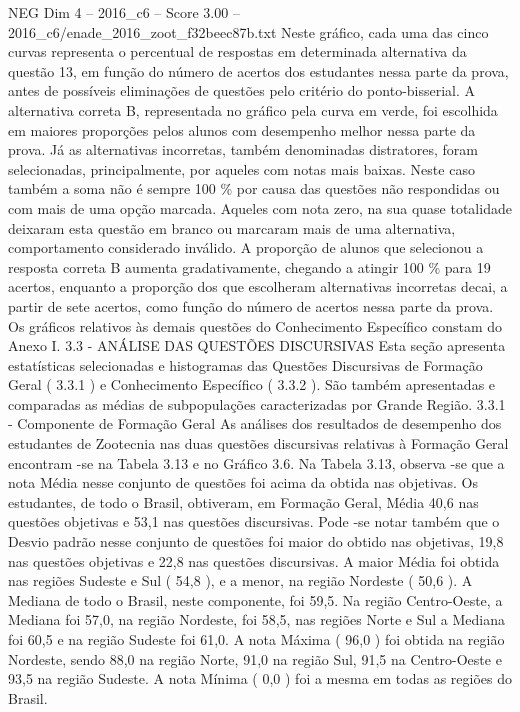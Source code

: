 \begin{textsample}{NEG Dim 4 – 2016\_c6 – Score 3.00 – 2016\_c6/enade\_2016\_zoot\_f32beec87b.txt}
Neste gráfico, cada uma das cinco curvas representa o percentual de respostas em determinada alternativa da questão 13, em função do número de acertos dos estudantes nessa parte da prova, antes de possíveis eliminações de questões pelo critério do ponto-bisserial.
A alternativa correta B, representada no gráfico pela curva em verde, foi escolhida em maiores proporções pelos alunos com desempenho melhor nessa parte da prova.
Já as alternativas incorretas, também denominadas distratores, foram selecionadas, principalmente, por aqueles com notas mais baixas.
Neste caso também a soma não é sempre 100 \% por causa das questões não respondidas ou com mais de uma opção marcada.
Aqueles com nota zero, na sua quase totalidade deixaram esta questão em branco ou marcaram mais de uma alternativa, comportamento considerado inválido.
A proporção de alunos que selecionou a resposta correta B aumenta gradativamente, chegando a atingir 100 \% para 19 acertos, enquanto a proporção dos que escolheram alternativas incorretas decai, a partir de sete acertos, como função do número de acertos nessa parte da prova.
Os gráficos relativos às demais questões do Conhecimento Específico constam do Anexo I. 3.3 - ANÁLISE DAS QUESTÕES DISCURSIVAS Esta seção apresenta estatísticas selecionadas e histogramas das Questões Discursivas de Formação Geral ( 3.3.1 ) e Conhecimento Específico ( 3.3.2 ).
São também apresentadas e comparadas as médias de subpopulações caracterizadas por Grande Região. 3.3.1 - Componente de Formação Geral As análises dos resultados de desempenho dos estudantes de Zootecnia nas duas questões discursivas relativas à Formação Geral encontram -se na Tabela 3.13 e no Gráfico 3.6.
Na Tabela 3.13, observa -se que a nota Média nesse conjunto de questões foi acima da obtida nas objetivas.
Os estudantes, de todo o Brasil, obtiveram, em Formação Geral, Média 40,6 nas questões objetivas e 53,1 nas questões discursivas.
Pode -se notar também que o Desvio padrão nesse conjunto de questões foi maior do obtido nas objetivas, 19,8 nas questões objetivas e 22,8 nas questões discursivas.
A maior Média foi obtida nas regiões Sudeste e Sul ( 54,8 ), e a menor, na região Nordeste ( 50,6 ).
A Mediana de todo o Brasil, neste componente, foi 59,5.
Na região Centro-Oeste, a Mediana foi 57,0, na região Nordeste, foi 58,5, nas regiões Norte e Sul a Mediana foi 60,5 e na região Sudeste foi 61,0.
A nota Máxima ( 96,0 ) foi obtida na região Nordeste, sendo 88,0 na região Norte, 91,0 na região Sul, 91,5 na Centro-Oeste e 93,5 na região Sudeste.
A nota Mínima ( 0,0 ) foi a mesma em todas as regiões do Brasil.

\end{textsample}
